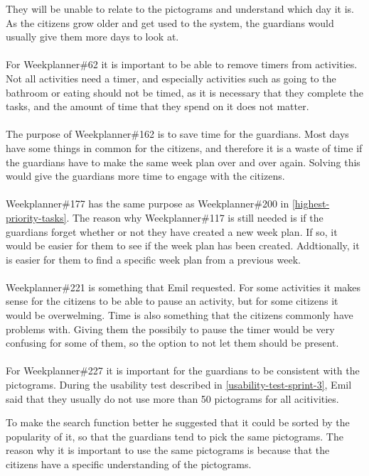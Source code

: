 They will be unable to relate to the pictograms and understand which day it is.
As the citizens grow older and get used to the system, the guardians would usually give them more days to look at.
\\\\
For Weekplanner\#62 it is important to be able to remove timers from activities. 
Not all activities need a timer, and especially activities such as going to the bathroom or eating should not be timed, as it is necessary that they complete the tasks, and the amount of time that they spend on it does not matter.
\\\\
The purpose of Weekplanner\#162 is to save time for the guardians. 
Most days have some things in common for the citizens, and therefore it is a waste of time if the guardians have to make the same week plan over and over again.
Solving this would give the guardians more time to engage with the citizens.
\\\\
Weekplanner\#177 has the same purpose as Weekplanner\#200 in \autoref{highest-priority-tasks}. 
The reason why Weekplanner\#117 is still needed is if the guardians forget whether or not they have created a new week plan.
If so, it would be easier for them to see if the week plan has been created.
Addtionally, it is easier for them to find a specific week plan from a previous week.
\\\\
Weekplanner\#221 is something that Emil requested. 
For some activities it makes sense for the citizens to be able to pause an activity, but for some citizens it would be overwelming.
Time is also something that the citizens commonly have problems with. 
Giving them the possibily to pause the timer would be very confusing for some of them, so the option to not let them should be present.
\\\\
For Weekplanner\#227 it is important for the guardians to be consistent with the pictograms.
During the usability test described in \autoref{usability-test-sprint-3}, Emil said that they usually do not use more than 50 pictograms for all acitivities.

To make the search function better he suggested that it could be sorted by the popularity of it, so that the guardians tend to pick the same pictograms.
The reason why it is important to use the same pictograms is because that the citizens have a specific understanding of the pictograms.


